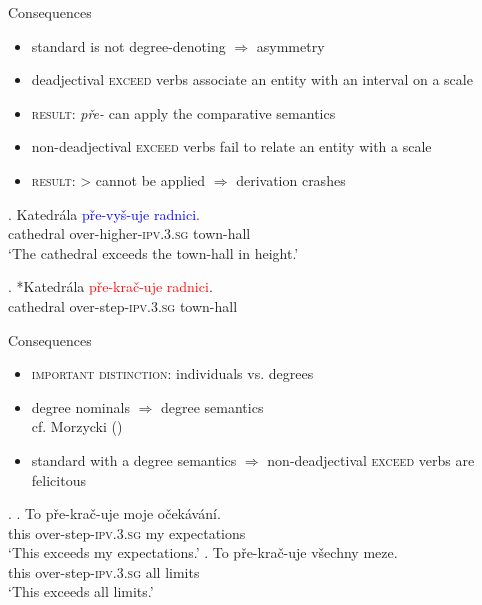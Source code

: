 \documentclass[12pt]{beamer}
\begin{document}
\begin{frame}{Consequences}

\begin{itemize}
\item standard is not degree-denoting $\Rightarrow$ asymmetry
\item deadjectival \textsc{exceed} verbs associate an entity with an interval on a scale
\item \textsc{result}: \textit{pře-} can apply the comparative semantics
\item non-deadjectival \textsc{exceed} verbs fail to relate an entity with a scale
\item \textsc{result}: > cannot be applied $\Rightarrow$ derivation crashes
\end{itemize}

\exg. Katedrála \textcolor{blue}{pře-vyš-uje} \textcolor{blue}{radnici}.\label{ex:ExVs-entities}\\
cathedral over-higher-\textsc{ipv.3.sg} town-hall\\
`The cathedral exceeds the town-hall in height.'

\exg. *Katedrála \textcolor{red}{pře-krač-uje} \textcolor{red}{radnici}.\\
cathedral over-step-\textsc{ipv.3.sg} town-hall\\

\end{frame}

\begin{frame}{Consequences}

\begin{itemize}
\item \textsc{important distinction}: individuals vs. degrees
\item degree nominals $\Rightarrow$ degree semantics \\\scriptsize cf. Morzycki (\citeyear{morzycki2009degree})\normalsize
\item standard with a degree semantics $\Rightarrow$ non-deadjectival \textsc{exceed} verbs are felicitous
\end{itemize}
\ex.\label{ex:ExVs-degree-nouns} \ag. To pře-krač-uje moje očekávání.\\
this over-step-\textsc{ipv.3.sg} my expectations\\
`This exceeds my expectations.'
\bg. To pře-krač-uje všechny meze.\\
this over-step-\textsc{ipv.3.sg} all limits\\
`This exceeds all limits.'

\end{frame}
\end{document}
